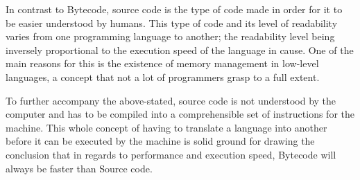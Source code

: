 \noindent In contrast to Bytecode, source code is the type of code made in order for it to be easier understood by humans. This type of code and its level of readability varies from one programming language to another; the readability level being inversely proportional to the execution speed of the language in cause. One of the main reasons for this is the existence of memory management in low-level languages, a concept that not a lot of programmers grasp to a full extent.  \newline



\noindent To further accompany the above-stated, source code is not understood by the computer and has to be compiled into a comprehensible set of instructions for the machine. This whole concept of having to translate a language into another before it can be executed by the machine is solid ground for drawing the conclusion that in regards to performance and execution speed, Bytecode will always be faster than Source code.%




